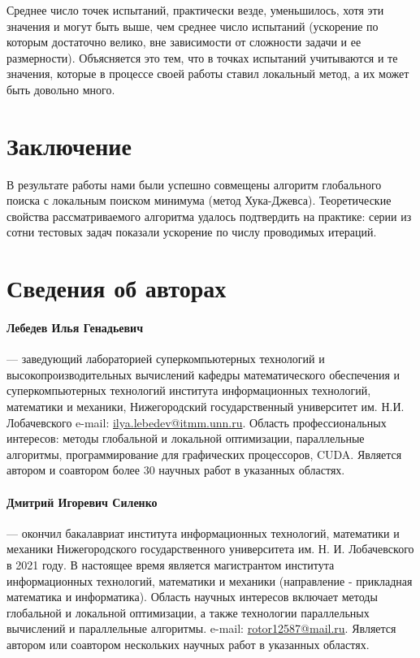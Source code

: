\documentclass[12pt, a4paper, russian]{article}
\begin{document}
Среднее число точек испытаний, практически везде, уменьшилось, хотя эти значения и могут быть выше, чем среднее число испытаний (ускорение по которым достаточно велико, вне зависимости от сложности задачи и ее размерности). Объясняется это тем, что в точках испытаний учитываются и те значения, которые в процессе своей работы ставил локальный метод, а их может быть довольно много.


\section{Заключение}



В результате работы нами были успешно совмещены алгоритм глобального поиска с локальным поиском минимума (метод Хука-Джевса). Теоретические свойства рассматриваемого алгоритма удалось подтвердить на практике: серии из сотни тестовых задач показали ускорение по числу проводимых итераций.

%
%
\renewcommand{\refname}{Список литературы}


\section*{Сведения об авторах}

\paragraph{Лебедев Илья Генадьевич} --- заведующий лабораторией суперкомпьютерных технологий и высокопроизводительных вычислений кафедры математического обеспечения и суперкомпьютерных технологий института информационных технологий, математики и механики, Нижегородский государственный университет им. Н.И. Лобачевского  e-mail: \url{ilya.lebedev@itmm.unn.ru}. Область профессиональных интересов: методы глобальной и локальной оптимизации, параллельные алгоритмы, программирование для графических процессоров, CUDA. Является автором и соавтором более 30 научных работ в указанных областях.

\paragraph{Дмитрий Игоревич Силенко} --- окончил бакалавриат института информационных технологий, математики и механики Нижегородского государственного университета им. Н. И. Лобачевского в 2021 году. В настоящее время является магистрантом института информационных технологий, математики и механики (направление - прикладная математика и информатика). Область научных интересов включает методы глобальной и локальной оптимизации, а также технологии параллельных вычислений и параллельные алгоритмы. e-mail: \url{rotor12587@mail.ru}. Является автором или соавтором нескольких научных работ в указанных областях.
\end{document}

